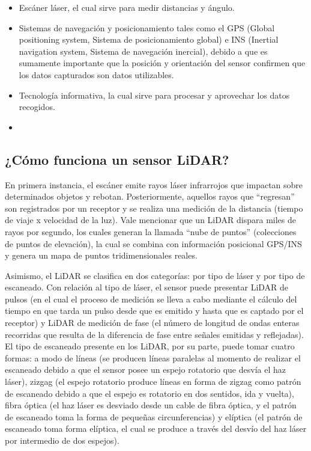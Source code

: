 \begin{itemize}
    \item Escáner láser, el cual sirve para medir distancias y ángulo.
    \item Sistemas de navegación y posicionamiento tales como el GPS (Global positioning system, Sistema de posicionamiento global) e INS (Inertial navigation system, Sistema de navegación inercial), debido a que es sumamente importante que la posición y orientación del sensor confirmen que los datos capturados son datos utilizables.
    \item Tecnología informativa, la cual sirve para procesar y aprovechar los datos recogidos.
    \item 
\end{itemize}

 \subsection{¿Cómo funciona un sensor LiDAR?}

En primera instancia, el escáner emite rayos láser infrarrojos que impactan sobre determinados objetos y rebotan. Posteriormente, aquellos rayos que “regresan” son registrados por un receptor y se realiza una medición de la distancia (tiempo de viaje x velocidad de la luz). Vale mencionar que un LiDAR dispara miles de rayos por segundo, los cuales generan la llamada “nube de puntos” (colecciones de puntos de elevación), la cual se combina con información posicional GPS/INS y genera un mapa de puntos tridimensionales reales.

Asimismo, el LiDAR se clasifica en dos categorías: por tipo de láser y por tipo de escaneado. Con relación al tipo de láser, el sensor puede presentar LiDAR de pulsos (en el cual el proceso de medición se lleva a cabo mediante el cálculo del tiempo en que tarda un pulso desde que es emitido y hasta que es captado por el receptor) y LiDAR de medición de fase (el número de longitud de ondas enteras recorridas que resulta de la diferencia de fase entre señales emitidas y reflejadas).
El tipo de escaneado presente en los LiDAR, por su parte, puede tomar cuatro formas: a modo de líneas (se producen líneas paralelas al momento de realizar el escaneado debido a que el sensor posee un espejo rotatorio que desvía el haz láser), zizgag (el espejo rotatorio produce líneas en forma de zigzag como patrón de escaneado debido a que el espejo es rotatorio en dos sentidos, ida y vuelta), fibra óptica (el haz láser es desviado desde un cable de fibra óptica, y el patrón de escaneado toma la forma de pequeñas circunferencias) y elíptica (el patrón de escaneado toma forma elíptica, el cual se produce a través del desvío del haz láser por intermedio de dos espejos).

